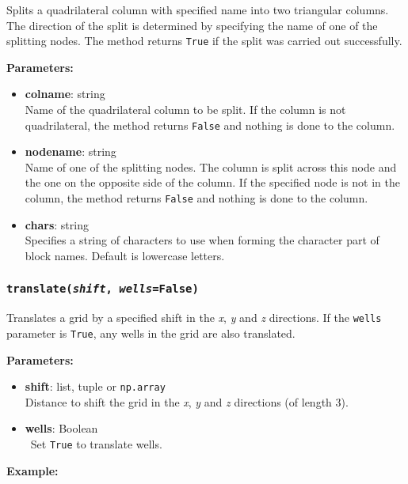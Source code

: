 Splits a quadrilateral column with specified name into two triangular columns.  The direction of the split is determined
by specifying the name of one of the splitting nodes.  The method returns \texttt{True} if the split was carried out successfully.

\textbf{Parameters:}
\begin{itemize}
\item \textbf{colname}: string\\
  Name of the quadrilateral column to be split.  If the column is not quadrilateral, the method returns \texttt{False} and nothing is done to the column.
\item \textbf{nodename}: string\\
  Name of one of the splitting nodes.  The column is split across this node and the one on the opposite side of the column.  If the specified node is not in the column, the method returns \texttt{False} and nothing is done to the column.
\item \textbf{chars}: string\\
  Specifies a string of characters to use when forming the character part of block names.  Default is lowercase letters.
\end{itemize}

\begin{snugshade}\subsubsection{\texttt{translate(\emph{shift}, \emph{wells}=\texttt{False})}}\end{snugshade}
\label{sec:mulgrid:translate}

Translates a grid by a specified shift in the \emph{x}, \emph{y} and \emph{z} directions.  If the \texttt{wells} parameter is \texttt{True}, any wells in the grid are also translated.

\textbf{Parameters:}
\begin{itemize}
  \item \textbf{shift}: list, tuple or \texttt{np.array}\\
    Distance to shift the grid in the \emph{x}, \emph{y} and \emph{z} directions (of length 3).
  \item \textbf{wells}: Boolean\\\
    Set \texttt{True} to translate wells.
\end{itemize}

\textbf{Example:}

